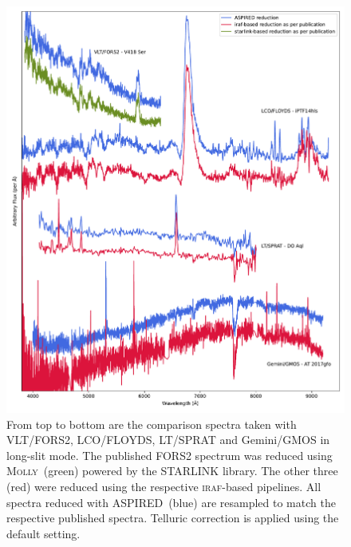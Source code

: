 \documentclass[linenumbers, twocolumn]{aastex631}
\begin{document}
\begin{figure}
    \centering
    \includegraphics[width=\textwidth]{fig_08_reduction_compared.pdf}
    \caption{From top to bottom are the comparison spectra taken with VLT/FORS2,
    LCO/FLOYDS, LT/SPRAT and Gemini/GMOS in long-slit mode. The published FORS2
    spectrum was reduced using \textsc{Molly}~(green) powered by the \textsc{STARLINK}
    library. The other three (red) were reduced using the respective \textsc{iraf}-based
    pipelines. All spectra reduced with \textsc{ASPIRED}~(blue) are resampled to match
    the respective published spectra. Telluric correction is applied using the default
    setting.}
    \label{fig:reduction_compared}
\end{figure}
\end{document}

